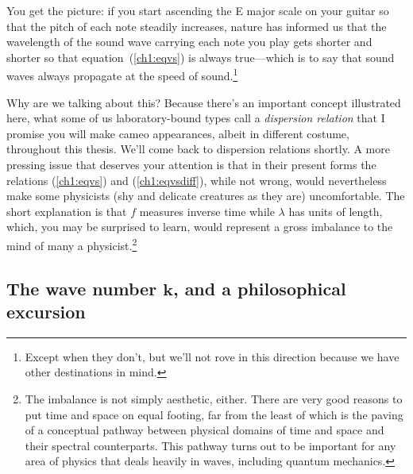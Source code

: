 You get the picture: if you start ascending the E major scale on your guitar so
that the pitch of each note steadily increases, nature has informed us that the
wavelength of the sound wave carrying each note you play gets shorter and
shorter so that equation~(\ref{ch1:eqvs}) is always true---which is to say that
sound waves always propagate at the speed of sound.\footnote{Except when they
  don't, but we'll not rove in this direction because we have other destinations
  in mind.}

Why are we talking about this? Because there's an important concept illustrated
here, what some of us laboratory-bound types call a \emph{dispersion relation}
that I promise you will make cameo appearances, albeit in different costume,
throughout this thesis. We'll come back to dispersion relations shortly. A more
pressing issue that deserves your attention is that in their present forms the
relations (\ref{ch1:eqvs}) and (\ref{ch1:eqvsdiff}), while not wrong, would
nevertheless make some physicists (shy and delicate creatures as they are)
uncomfortable. The short explanation is that $f$ measures inverse time while
$\lambda$ has units of length, which, you may be surprised to learn, would
represent a gross imbalance to the mind of many a physicist.\footnote{The
  imbalance is not simply aesthetic, either. There are very good reasons to put
  time and space on equal footing, far from the least of which is the paving of
  a conceptual pathway between physical domains of time and space and their
  spectral counterparts. This pathway turns out to be important for any area of
  physics that deals heavily in waves, including quantum mechanics.}

\subsection{The wave number $\mathbf{k}$, and a philosophical excursion}
\label{subsec:k}

